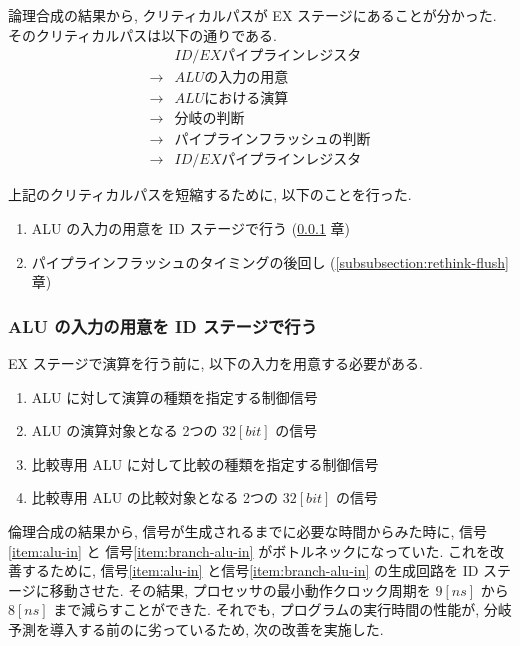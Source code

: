 \documentclass[../improvements.tex]{subfiles}
\begin{document}
  論理合成の結果から, クリティカルパスが EX ステージにあることが分かった.
  そのクリティカルパスは以下の通りである.
  \begin{displaymath}
    \begin{aligned}
      &ID/EX パイプラインレジスタ \\
      \rightarrow &ALU の入力の用意 \\
      \rightarrow &ALU における演算 \\
      \rightarrow &分岐の判断 \\
      \rightarrow &パイプラインフラッシュの判断 \\
      \rightarrow &ID/EX パイプラインレジスタ
    \end{aligned}
  \end{displaymath}

  上記のクリティカルパスを短縮するために, 以下のことを行った.
  \begin{enumerate}
    \item ALU の入力の用意を ID ステージで行う (\ref{subsubsection:ex-to-id} 章)
    \item パイプラインフラッシュのタイミングの後回し (\ref{subsubsection:rethink-flush} 章)
  \end{enumerate}

  \subsubsection{ALU の入力の用意を ID ステージで行う} \label{subsubsection:ex-to-id}
  EX ステージで演算を行う前に, 以下の入力を用意する必要がある.
  \begin{enumerate}
    \item ALU に対して演算の種類を指定する制御信号 \label{item:alu-op}
    \item ALU の演算対象となる 2つの $32[bit]$ の信号 \label{item:alu-in}
    \item 比較専用 ALU に対して比較の種類を指定する制御信号 \label{item:branch-alu-op}
    \item 比較専用 ALU の比較対象となる 2つの $32[bit]$ の信号 \label{item:branch-alu-in}
  \end{enumerate}
  倫理合成の結果から, 信号が生成されるまでに必要な時間からみた時に,
  信号\ref{item:alu-in} と 信号\ref{item:branch-alu-in} がボトルネックになっていた.
  これを改善するために, 信号\ref{item:alu-in} と信号\ref{item:branch-alu-in} の生成回路を
  ID ステージに移動させた.
  その結果, プロセッサの最小動作クロック周期を $9[ns]$ から $8[ns]$ まで減らすことができた.
  それでも, プログラムの実行時間の性能が, 分岐予測を導入する前のに劣っているため, 
  次の改善を実施した.
\end{document}
